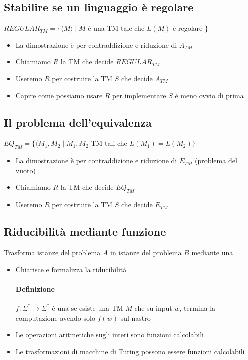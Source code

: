 \subsection{Stabilire se un linguaggio è regolare}
$REGULAR_{TM} = \{\langle M\rangle\mid M$ è una TM tale che $L(M)$ è regolare $\}$ 
\begin{itemize}
	\item La dimostrazione è per contraddizione e riduzione di $A_{TM}$ 
	\item Chiamiamo $R$ la TM che decide $REGULAR_{TM}$ 
	\item Useremo $R$ per costruire la TM $S$ che decide $A_{TM}$ 
	\item Capire come possiamo usare $R$ per implementare $S$ è meno ovvio di prima 
\end{itemize}

\subsection{Il problema dell'equivalenza}
$EQ_{TM} = \{\langle M_1,M_2\mid M_1, M_2$ TM tali che $L(M_1)=L(M_2)\}$ 
\begin{itemize}
	\item La dimostrazione è per contraddizione e riduzione di $E_{TM}$ (problema del vuoto)
	\item Chiamiamo $R$ la TM che decide $EQ_{TM}$ 
	\item Useremo $R$ per costruire la TM $S$ che decide $E_{TM}$ 
\end{itemize}

\subsection{Riducibilità mediante funzione}
Trasforma istanze del problema $A$ in istanze del problema $B$ mediante una  
\begin{itemize}
	\item Chiarisce e formalizza la riducibilità
		\paragraph{Definizione}
		$f:\Sigma^*\rightarrow\Sigma^*$ è una  se esiste una TM $M$ che su input $w$, termina la computazione avendo solo $f(w)$ sul nastro
	\item Le operazioni aritmetiche sugli interi sono funzioni calcolabili
	\item Le trasformazioni di macchine di Turing possono essere funzioni calcolabili
\end{itemize}

